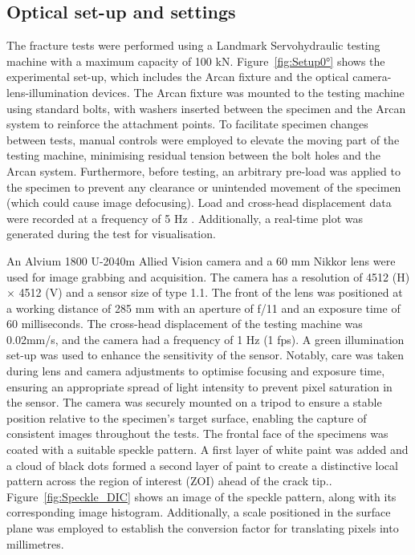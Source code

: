 \documentclass[3p,times,procedia]{elsarticle}
\begin{document}
\subsection{Optical set-up and settings}\label{Ss:optical}

The fracture tests were performed using a Landmark Servohydraulic testing machine with a maximum capacity of 100 kN. Figure~\ref{fig:Setup0°} shows the experimental set-up, which includes the Arcan fixture and the optical camera-lens-illumination devices. The Arcan fixture was mounted to the testing machine using standard bolts, with washers inserted between the specimen and the Arcan system to reinforce the attachment points. To facilitate specimen changes between tests, manual controls were employed to elevate the moving part of the testing machine, minimising residual tension between the bolt holes and the Arcan system. Furthermore, before testing, an arbitrary pre-load was applied to the specimen to prevent any clearance or unintended movement of the specimen (which could cause image defocusing). Load and cross-head displacement data were recorded at a frequency of 5 Hz . Additionally, a real-time plot was generated during the test for visualisation.


An Alvium 1800 U-2040m Allied Vision camera and a 60 mm Nikkor lens were used for image grabbing and acquisition. The camera has a resolution of 4512 (H) $\times$ 4512 (V) and a sensor size of type 1.1. The front of the lens was positioned at a working distance of 285 mm with an aperture of f/11 and an exposure time of 60 milliseconds. The cross-head displacement of the testing machine was 0.02mm/s, and the camera had a frequency of 1 Hz (1 fps).
A green illumination set-up was used to enhance the sensitivity of the sensor. Notably, care was taken during lens and camera adjustments to optimise focusing and exposure time, ensuring an appropriate spread of light intensity to prevent pixel saturation in the sensor. The camera was securely mounted on a tripod to ensure a stable position relative to the specimen's target surface, enabling the capture of consistent images throughout the tests. The frontal face of the specimens was coated with a suitable speckle pattern. A first layer of white paint was added and a cloud of black dots formed a second layer of paint to create a distinctive local pattern across the region of interest (ZOI) ahead of the crack tip.. Figure~\ref{fig:Speckle_DIC} shows an image of the speckle pattern, along with its corresponding image histogram. Additionally, a scale positioned in the surface plane was employed to establish the conversion factor for translating pixels into millimetres.
\end{document}
